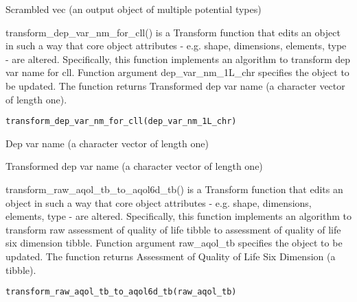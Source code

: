 \documentclass[a4paper]{book}
\begin{document}
%
\begin{Value}
Scrambled vec (an output object of multiple potential types)
\end{Value}
%
\begin{Description}\relax
transform\_dep\_var\_nm\_for\_cll() is a Transform function that edits an object in such a way that core object attributes - e.g. shape, dimensions, elements, type - are altered. Specifically, this function implements an algorithm to transform dep var name for cll. Function argument dep\_var\_nm\_1L\_chr specifies the object to be updated. The function returns Transformed dep var name (a character vector of length one).
\end{Description}
%
\begin{Usage}
\begin{verbatim}
transform_dep_var_nm_for_cll(dep_var_nm_1L_chr)
\end{verbatim}
\end{Usage}
%
\begin{Arguments}
\begin{ldescription}
\item[\code{dep\_var\_nm\_1L\_chr}] Dep var name (a character vector of length one)
\end{ldescription}
\end{Arguments}
%
\begin{Value}
Transformed dep var name (a character vector of length one)
\end{Value}
%
\begin{Description}\relax
transform\_raw\_aqol\_tb\_to\_aqol6d\_tb() is a Transform function that edits an object in such a way that core object attributes - e.g. shape, dimensions, elements, type - are altered. Specifically, this function implements an algorithm to transform raw assessment of quality of life tibble to assessment of quality of life six dimension tibble. Function argument raw\_aqol\_tb specifies the object to be updated. The function returns Assessment of Quality of Life Six Dimension (a tibble).
\end{Description}
%
\begin{Usage}
\begin{verbatim}
transform_raw_aqol_tb_to_aqol6d_tb(raw_aqol_tb)
\end{verbatim}
\end{Usage}
\end{document}
